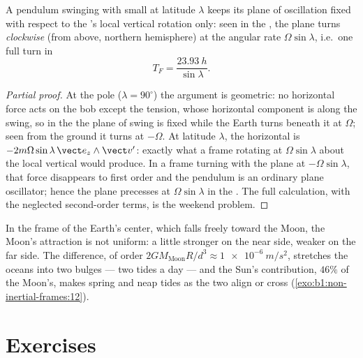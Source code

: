 \begin{proposition}\label{prop:b1:non-inertial-frames:foucault}
A pendulum swinging with small  at latitude $\lambda$ keeps its
plane of oscillation fixed with respect to the 's local
vertical rotation only: seen in the , the plane turns
\emph{clockwise} (from above, northern hemisphere) at the angular rate
$\Omega\sin\lambda$, i.e.\ one full turn in
\[
T_F = \frac{\qty{23.93}{h}}{\sin\lambda} .
\]
\end{proposition}

\begin{proof}[Partial proof]
At the pole ($\lambda = 90^\circ$) the argument is geometric: no horizontal
force acts on the bob except the tension, whose horizontal component is
along the swing, so in the  the plane of swing is fixed
while the Earth turns beneath it at $\Omega$; seen from the ground it turns
at $-\Omega$. At latitude $\lambda$, the horizontal  is
$-2m\Omega\sin\lambda\,\vect e_z\wedge\vect v'$: exactly what a frame rotating at
$\Omega\sin\lambda$ about the local vertical would produce. In a frame turning
with the plane at $-\Omega\sin\lambda$, that force disappears to first order
and the pendulum is an ordinary plane oscillator; hence the plane
precesses at $\Omega\sin\lambda$ in the . The full
calculation, with the neglected second-order terms, is the weekend
problem.
\end{proof}

\begin{remark}\label{rem:b1:non-inertial-frames:tides}
In the frame of the Earth's center, which falls freely toward the Moon,
the Moon's attraction is not uniform: a little stronger on the near side,
weaker on the far side. The difference, of order $2GM_{\text{Moon}}R/d^3
\approx \qty{1e-6}{m/s^2}$, stretches the oceans into two bulges --- two
tides a day --- and the Sun's contribution, $46\%$ of the Moon's, makes
spring and neap tides as the two align or cross
(\cref{exo:b1:non-inertial-frames:12}).
\end{remark}

\section{Exercises}

